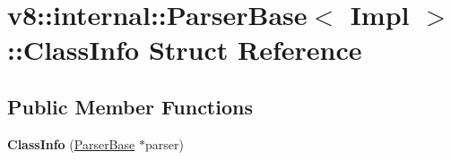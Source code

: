 \hypertarget{structv8_1_1internal_1_1ParserBase_1_1ClassInfo}{}\section{v8\+:\+:internal\+:\+:Parser\+Base$<$ Impl $>$\+:\+:Class\+Info Struct Reference}
\label{structv8_1_1internal_1_1ParserBase_1_1ClassInfo}
\subsection*{Public Member Functions}
\begin{DoxyCompactItemize}
\item 
\mbox{\label{structv8_1_1internal_1_1ParserBase_1_1ClassInfo_ac334810a628169174cf25d9afdc6019d}} 
{\bfseries Class\+Info} (\mbox{\hyperlink{classv8_1_1internal_1_1ParserBase}{Parser\+Base}} $\ast$parser)
\end{DoxyCompactItemize}
